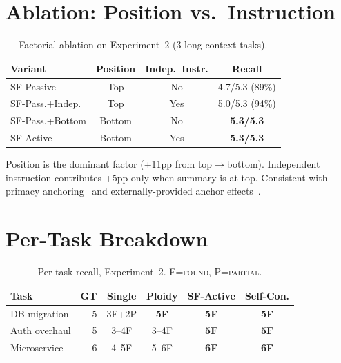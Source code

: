 \documentclass{article}
\begin{document}
\section{Ablation: Position vs.\ Instruction}
\label{sec:ablation-appendix}

\begin{table}[H]
\centering
\caption{Factorial ablation on Experiment~2 (3 long-context tasks).}
\label{tab:ablation}
\small
\begin{tabular}{@{}lccc@{}}
\toprule
\textbf{Variant} & \textbf{Position} & \textbf{Indep.\ Instr.} & \textbf{Recall} \\
\midrule
SF-Passive & Top & No & 4.7/5.3 (89\%) \\
SF-Pass.+Indep. & Top & Yes & 5.0/5.3 (94\%) \\
SF-Pass.+Bottom & Bottom & No & \textbf{5.3/5.3} \\
SF-Active & Bottom & Yes & \textbf{5.3/5.3} \\
\bottomrule
\end{tabular}
\end{table}

Position is the dominant factor (+11pp from top$\to$bottom). Independent instruction contributes +5pp only when summary is at top. Consistent with primacy anchoring~\citep{liu2023lost} and externally-provided anchor effects~\citep{epley2006anchoring}.

\section{Per-Task Breakdown}
\label{sec:pertask-appendix}

\begin{table}[H]
\centering
\caption{Per-task recall, Experiment~2. F=\textsc{found}, P=\textsc{partial}.}
\small
\begin{tabular}{@{}lr cccc@{}}
\toprule
\textbf{Task} & \textbf{GT} & \textbf{Single} & \textbf{Ploidy} & \textbf{SF-Active} & \textbf{Self-Con.} \\
\midrule
DB migration & 5 & 3F+2P & \textbf{5F} & \textbf{5F} & \textbf{5F} \\
Auth overhaul & 5 & 3--4F & 3--4F & \textbf{5F} & \textbf{5F} \\
Microservice & 6 & 4--5F & 5--6F & \textbf{6F} & \textbf{6F} \\
\bottomrule
\end{tabular}
\end{table}
\end{document}
